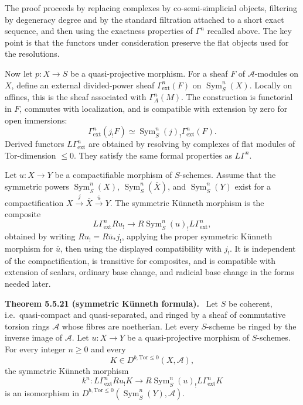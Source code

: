 \documentclass[12pt]{article}
\newcommand{\Aa}{\mathcal A}
\DeclareMathOperator{\Sym}{Sym}
\newcommand{\torleq}{\mathrm{Tor}\leq}
\newcommand{\ie}{i.e.\ }
\newenvironment{statement}[1]{\par\medskip\noindent\textbf{#1.}\ }{\par\medskip}
\begin{document}
The proof proceeds by replacing complexes by co-semi-simplicial objects, filtering by degeneracy degree and by the standard filtration attached to a short exact sequence, and then using the exactness properties of \(\Gamma^n\) recalled above. The key point is that the functors under consideration preserve the flat objects used for the resolutions.

Now let \(p:X\to S\) be a quasi-projective morphism. For a sheaf \(F\) of \(\Aa\)-modules on \(X\), define an external divided-power sheaf \(\Gamma^n_{\mathrm{ext}}(F)\) on \(\Sym^n_S(X)\). Locally on affines, this is the sheaf associated with \(\Gamma^n_A(M)\). The construction is functorial in \(F\), commutes with localization, and is compatible with extension by zero for open immersions:
\[
\Gamma^n_{\mathrm{ext}}(j_!F)
\simeq
\Sym^n_S(j)_!\Gamma^n_{\mathrm{ext}}(F).
\]
Derived functors \(L\Gamma^n_{\mathrm{ext}}\) are obtained by resolving by complexes of flat modules of Tor-dimension \(\le0\). They satisfy the same formal properties as \(L\Gamma^n\).

Let \(u:X\to Y\) be a compactifiable morphism of \(S\)-schemes. Assume that the symmetric powers \(\Sym^n_S(X)\), \(\Sym^n_S(\bar X)\), and \(\Sym^n_S(Y)\) exist for a compactification \(X\xrightarrow{j}\bar X\xrightarrow{\bar u}Y\). The symmetric K\"unneth morphism is the composite
\[
L\Gamma^n_{\mathrm{ext}}Ru_!
\longrightarrow
R\Sym^n_S(u)_!L\Gamma^n_{\mathrm{ext}},
\]
obtained by writing \(Ru_!=R\bar u_*j_!\), applying the proper symmetric K\"unneth morphism for \(\bar u\), then using the displayed compatibility with \(j_!\). It is independent of the compactification, is transitive for composites, and is compatible with extension of scalars, ordinary base change, and radicial base change in the forms needed later.

\begin{statement}{Theorem 5.5.21 (symmetric K\"unneth formula)}
Let \(S\) be coherent, \ie quasi-compact and quasi-separated, and ringed by a sheaf of commutative torsion rings \(\Aa\) whose fibres are noetherian. Let every \(S\)-scheme be ringed by the inverse image of \(\Aa\). Let \(u:X\to Y\) be a quasi-projective morphism of \(S\)-schemes. For every integer \(n\ge0\) and every
\[
K\in D^{b,\torleq0}(X,\Aa),
\]
the symmetric K\"unneth morphism
\[
k^n:L\Gamma^n_{\mathrm{ext}}Ru_!K
\longrightarrow
R\Sym^n_S(u)_!L\Gamma^n_{\mathrm{ext}}K
\]
is an isomorphism in \(D^{b,\torleq0}(\Sym^n_S(Y),\Aa)\).
\end{statement}
\end{document}
